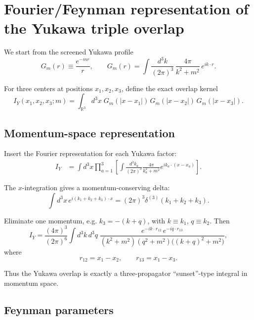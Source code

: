 
\section{Fourier/Feynman representation of the Yukawa triple overlap}

We start from the screened Yukawa profile
\begin{equation}
G_m(r) \equiv \frac{e^{-mr}}{r},
\qquad
G_m(r)=\int \frac{d^3k}{(2\pi)^3}\,\frac{4\pi}{k^2+m^2}\,e^{i k\cdot r}.
\end{equation}

For three centers at positions $x_1,x_2,x_3$, define the exact overlap kernel
\begin{equation}
I_Y(x_1,x_2,x_3;m)
=
\int_{\mathbb R^3} d^3x\;
G_m(|x-x_1|)\,G_m(|x-x_2|)\,G_m(|x-x_3|).
\end{equation}

\subsection{Momentum-space representation}

Insert the Fourier representation for each Yukawa factor:
\begin{align}
I_Y
&=
\int d^3x
\prod_{a=1}^3
\left[
\int \frac{d^3k_a}{(2\pi)^3}
\frac{4\pi}{k_a^2+m^2}
e^{i k_a\cdot (x-x_a)}
\right].
\end{align}

The $x$-integration gives a momentum-conserving delta:
\begin{equation}
\int d^3x\,e^{i(k_1+k_2+k_3)\cdot x}
=
(2\pi)^3 \delta^{(3)}(k_1+k_2+k_3).
\end{equation}

Eliminate one momentum, e.g. $k_3=-(k+q)$, with $k\equiv k_1$, $q\equiv k_2$. Then
\begin{equation}
I_Y
=
\frac{(4\pi)^3}{(2\pi)^6}
\int d^3k\,d^3q\;
\frac{
e^{-i k\cdot r_{12}}\,e^{-i q\cdot r_{13}}
}{
(k^2+m^2)(q^2+m^2)\big((k+q)^2+m^2\big)
},
\end{equation}
where
\begin{equation}
r_{12}=x_1-x_2,\qquad
r_{13}=x_1-x_3.
\end{equation}

Thus the Yukawa overlap is exactly a three-propagator ``sunset''-type integral in momentum space.

\subsection{Feynman parameters}

